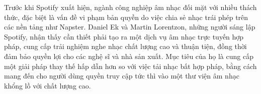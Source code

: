Trước khi Spotify xuất hiện, ngành công nghiệp âm nhạc đối mặt với nhiều thách thức, đặc biệt là vấn đề vi phạm bản quyền do việc chia sẻ nhạc trái phép trên các nền tảng như Napster. Daniel Ek và Martin Lorentzon, những người sáng lập Spotify, nhận thấy cần thiết phải tạo ra một dịch vụ âm nhạc trực tuyến hợp pháp, cung cấp trải nghiệm nghe nhạc chất lượng cao và thuận tiện, đồng thời đảm bảo quyền lợi cho các nghệ sĩ và nhà sản xuất. Mục tiêu của họ là cung cấp một giải pháp thay thế hấp dẫn hơn so với việc tải nhạc bất hợp pháp, bằng cách mang đến cho người dùng quyền truy cập tức thì vào một thư viện âm nhạc khổng lồ với chất lượng cao. 